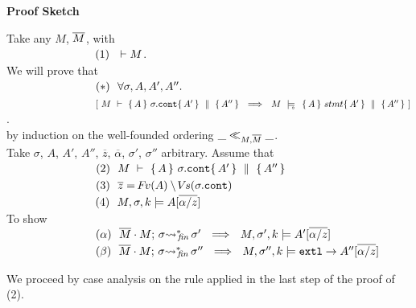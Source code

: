 \noindent
\vspace{.2cm}
  {\textbf{Proof Sketch}} 


\noindent
Take any $M$, $\overline{M}$, with\\ 
$\strut \ \ \hspace{2.3cm} \ \ (1) \ \ \vdash M $.
\\
We will prove that\\
$\strut \ \ \hspace{2.3cm} \ \ (*)\ \ \forall \sigma, A, A', A''.$\\
$\strut \ \ \hspace{2.3cm} \ \ \ \ \  \ \ [ \ M\ \vdash\  \quadruple {A} {\sigma.\prg{cont}} {A'} {A''}  \ \ \Longrightarrow \ \    M\ \modelsD\  \quadruple {A} {stmt} {A'} {A''}\ ]$.\\
by induction on the well-founded ordering  $\_ \ll_{M,\overline{M}}  \_$.
\\
Take $\sigma$, $A$, $A'$, $A''$, $\overline z$, $\overline \alpha$, $\sigma'$, $\sigma''$  arbitrary. Assume that\\
$\strut \ \ \hspace{2.3cm} \ \ (2) \ \ M\ \vdash\  \quadruple {A} {\sigma.\prg{cont}} {A'} {A''}$\\
$\strut \ \ \hspace{2.3cm} \ \ (3) \ \ \overline z = \fv(A)\setminus \vs(\sigma.\prg{cont})$\\
$\strut \ \ \hspace{2.3cm} \ \ (4) \ \ \satDAssertFrom M  \sigma k   A[\overline{\alpha/z}]$\\
To show\\
$\strut \ \ \hspace{2.3cm} \ \ (\alpha) \ \    \leadstoBoundedStarFin {\Mtwo\cdot M}  {\sigma}  {\sigma'}\ \ \Longrightarrow\ \     \satDAssertFrom M  {\sigma'} k   A'[\overline{\alpha/z}]$\\
$\strut \ \ \hspace{2.3cm} \ \ (\beta) \ \    \leadstoBoundedStarFin {\Mtwo\cdot M}  {\sigma}  {\sigma''}\ \ \Longrightarrow\ \     \satDAssertFrom M  {\sigma''}  k  \extThis \rightarrow A''[\overline{\alpha/z}]$
 
 \vspace{.2cm}
\noindent
We proceed by case analysis on the  rule applied in the last step of the proof of (2).

